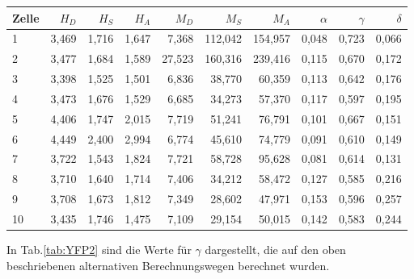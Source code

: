 \begin{center}
    
\centering
\begin{tabular}{lrrrrrrrrr}
    \toprule
    Zelle &  $H_D$ &  $H_S$ &  $H_A$ &   $M_D$ &    $M_S$ &    $M_A$ &  $\alpha$ &  $\gamma$ &  $\delta$ \\
    \midrule
    1     & 3,469 & 1,716 & 1,647 &  7,368 & 112,042 & 154,957 &  0,048 &  0,723 &  0,066 \\
    2     & 3,477 & 1,684 & 1,589 & 27,523 & 160,316 & 239,416 &  0,115 &  0,670 &  0,172 \\
    3     & 3,398 & 1,525 & 1,501 &  6,836 &  38,770 &  60,359 &  0,113 &  0,642 &  0,176 \\
    4     & 3,473 & 1,676 & 1,529 &  6,685 &  34,273 &  57,370 &  0,117 &  0,597 &  0,195 \\
    5     & 4,406 & 1,747 & 2,015 &  7,719 &  51,241 &  76,791 &  0,101 &  0,667 &  0,151 \\
    6     & 4,449 & 2,400 & 2,994 &  6,774 &  45,610 &  74,779 &  0,091 &  0,610 &  0,149 \\
    7     & 3,722 & 1,543 & 1,824 &  7,721 &  58,728 &  95,628 &  0,081 &  0,614 &  0,131 \\
    8     & 3,710 & 1,640 & 1,714 &  7,406 &  34,212 &  58,472 &  0,127 &  0,585 &  0,216 \\
    9     & 3,708 & 1,673 & 1,812 &  7,349 &  28,602 &  47,971 &  0,153 &  0,596 &  0,257 \\
    10    & 3,435 & 1,746 & 1,475 &  7,109 &  29,154 &  50,015 &  0,142 &  0,583 &  0,244 \\
    \bottomrule
\end{tabular}
\label{tab:YFP1}
\end{center}

In Tab.\ref{tab:YFP2} sind die Werte für $\gamma$ dargestellt, die auf den oben beschriebenen alternativen Berechnungswegen berechnet 
wurden.


